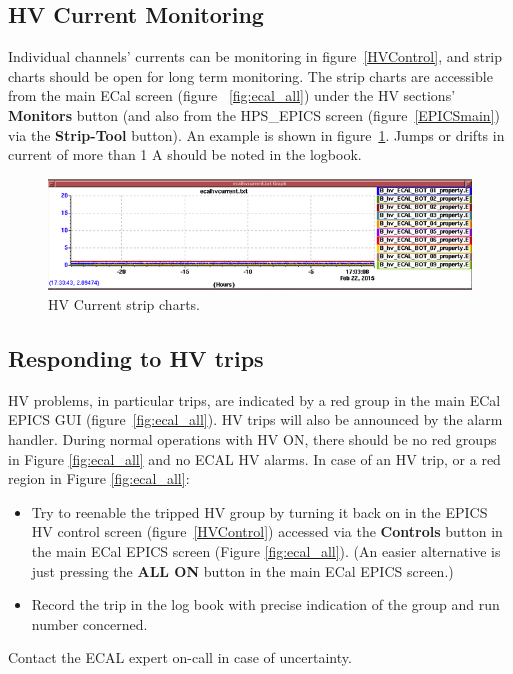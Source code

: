 \documentclass[12pt]{article}
\begin{document}
   \subsection{HV Current Monitoring}
   Individual channels' currents can be monitoring in figure~\ref{HVControl}, and strip charts should be open for long term monitoring.  The strip charts are accessible from the main ECal screen (figure ~\ref{fig:ecal_all}) under the HV sections' {\bf Monitors} button (and also from the HPS\_EPICS screen (figure~\ref{EPICSmain}) via the {\bf Strip-Tool} button).  An example is shown in figure~\ref{fig:hvcurrentstrips}.  Jumps or drifts in current of more than 1 A should be noted in the logbook.

   \begin{figure}[htbp]\centering
       \includegraphics[width=16cm]{pics/hvcurrentstrip.png}
       \caption{HV Current strip charts.\label{fig:hvcurrentstrips}}
   \end{figure}


   \subsection{Responding to HV trips}

   HV problems, in particular trips, are indicated by a red group in the main ECal EPICS GUI (figure~\ref{fig:ecal_all}).  HV trips will also be announced by the alarm handler.  During normal operations with HV ON, there should be no red groups in Figure \ref{fig:ecal_all} and no ECAL HV alarms.  In case of an HV trip, or a red region in Figure \ref{fig:ecal_all}:
\begin{itemize}
    \item Try to reenable the tripped HV group by turning it back on in the EPICS HV control screen (figure~\ref{HVControl}) accessed via the {\bf Controls} button in the main ECal EPICS screen (Figure \ref{fig:ecal_all}).  (An easier alternative is just pressing the {\bf ALL ON}
button in the main ECal EPICS screen.)
    \item Record the trip in the log book with precise indication of the group and run
        number concerned. 
\end{itemize}
Contact the ECAL expert on-call in case of uncertainty.
      
\end{document}

